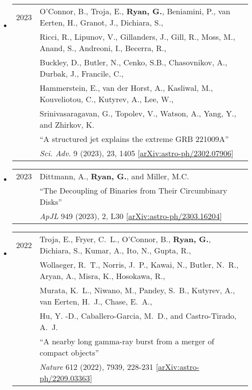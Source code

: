 \begin{itemize}
\item \begin{tabular}{ll}
2023 & {O'Connor}, B., {Troja}, E., {\bf {Ryan}, G.}, {Beniamini}, P., {van Eerten}, H., {Granot}, J., {Dichiara}, S.,  \\
	& {Ricci}, R., {Lipunov}, V., {Gillanders}, J., {Gill}, R., {Moss}, M., {Anand}, S., {Andreoni}, I., {Becerra}, R., \\
	& {Buckley}, D., {Butler}, N.,  {Cenko}, S.B., {Chasovnikov}, A., {Durbak}, J., {Francile}, C., \\ 
	& {Hammerstein}, E., {van der Horst}, A., {Kasliwal}, M., {Kouveliotou}, C., {Kutyrev}, A., {Lee}, W.,  \\
	& {Srinivasaragavan}, G., {Topolev}, V., {Watson}, A., {Yang}, Y., and {Zhirkov}, K.\\
	&``A structured jet explains the extreme GRB 221009A'' \\
	& \emph{Sci. Adv.} 9 (2023), 23, 1405 [\href{https://arxiv.org/abs/2302.07906}{arXiv:astro-ph/2302.07906}]\\
\end{tabular}

\item \begin{tabular}{ll}
2023 & {Dittmann}, A., {\bf {Ryan}, G.}, and {Miller}, M.C.\\
	&``The Decoupling of Binaries from Their Circumbinary Disks'' \\
	& \emph{ApJL} 949 (2023), 2, L30 [\href{https://arxiv.org/abs/2303.16204}{arXiv:astro-ph/2303.16204}]\\
\end{tabular}

\item \begin{tabular}{ll}
2022 & {Troja}, E., {Fryer}, C.~L., {O'Connor}, B., {\bf {Ryan}, G.}, {Dichiara}, S., {Kumar}, A., {Ito}, N., {Gupta}, R.,\\
	&  {Wollaeger}, R.~T., {Norris}, J.~P., {Kawai}, N., {Butler}, N.~R., {Aryan}, A., {Misra}, K., {Hosokawa}, R., \\
	& {Murata}, K.~L., {Niwano}, M., {Pandey}, S.~B., {Kutyrev}, A., {van Eerten}, H.~J., {Chase}, E.~A., \\
	& {Hu}, Y. -D., {Caballero-Garcia}, M.~D., and {Castro-Tirado}, A.~J.  \\
	&``A nearby long gamma-ray burst from a merger of compact objects'' \\
	& \emph{Nature} 612 (2022), 7939, 228-231 [\href{https://arxiv.org/abs/2209.03363}{arXiv:astro-ph/2209.03363}]\\
\end{tabular}


\end{itemize}
